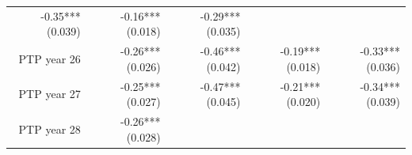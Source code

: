 \documentclass[]{article}
\begin{document}
\begin{longtable}[c]{@{}rrrrr@{}}
\begin{minipage}[t]{0.16\columnwidth}
-0.35*** (0.039)
\strut\end{minipage} &
\begin{minipage}[t]{0.18\columnwidth}\raggedleft\strut
-0.16*** (0.018)
\strut\end{minipage} &
\begin{minipage}[t]{0.15\columnwidth}\raggedleft\strut
-0.29*** (0.035)
\strut\end{minipage}\tabularnewline
\begin{minipage}[t]{0.17\columnwidth}\raggedleft\strut
PTP year 26
\strut\end{minipage} &
\begin{minipage}[t]{0.20\columnwidth}\raggedleft\strut
-0.26*** (0.026)
\strut\end{minipage} &
\begin{minipage}[t]{0.16\columnwidth}\raggedleft\strut
-0.46*** (0.042)
\strut\end{minipage} &
\begin{minipage}[t]{0.18\columnwidth}\raggedleft\strut
-0.19*** (0.018)
\strut\end{minipage} &
\begin{minipage}[t]{0.15\columnwidth}\raggedleft\strut
-0.33*** (0.036)
\strut\end{minipage}\tabularnewline
\begin{minipage}[t]{0.17\columnwidth}\raggedleft\strut
PTP year 27
\strut\end{minipage} &
\begin{minipage}[t]{0.20\columnwidth}\raggedleft\strut
-0.25*** (0.027)
\strut\end{minipage} &
\begin{minipage}[t]{0.16\columnwidth}\raggedleft\strut
-0.47*** (0.045)
\strut\end{minipage} &
\begin{minipage}[t]{0.18\columnwidth}\raggedleft\strut
-0.21*** (0.020)
\strut\end{minipage} &
\begin{minipage}[t]{0.15\columnwidth}\raggedleft\strut
-0.34*** (0.039)
\strut\end{minipage}\tabularnewline
\begin{minipage}[t]{0.17\columnwidth}\raggedleft\strut
PTP year 28
\strut\end{minipage} &
\begin{minipage}[t]{0.20\columnwidth}\raggedleft\strut
-0.26*** (0.028)
\strut\end{minipage} &
\begin{minipage}[t]{0.16\columnwidth}\raggedleft\strut

\end{minipage}
\end{longtable}
\end{document}
